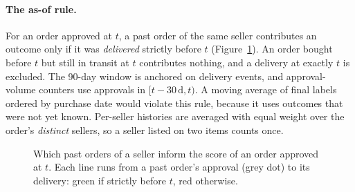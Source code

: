 \documentclass[10pt,twocolumn]{article}
\begin{document}
\paragraph{The as-of rule.} For an order approved at $t$, a past order of the same seller contributes an
outcome only if it was \emph{delivered} strictly before $t$ (Figure~\ref{fig:asof}). An order bought
before $t$ but still in transit at $t$ contributes nothing, and a delivery at exactly $t$ is excluded.
The 90-day window is anchored on delivery events, and approval-volume counters use approvals in
$[t-30\,\mathrm{d}, t)$. A moving average of final labels ordered by purchase date would violate this
rule, because it uses outcomes that were not yet known. Per-seller histories are averaged with equal
weight over the order's \emph{distinct} sellers, so a seller listed on two items counts once.

\begin{figure}[!ht]
\centering
{}
\caption{Which past orders of a seller inform the score of an order approved at $t$. Each line runs
from a past order's approval (grey dot) to its delivery: green if strictly before $t$, red otherwise.}
\label{fig:asof}
\end{figure}
\end{document}
